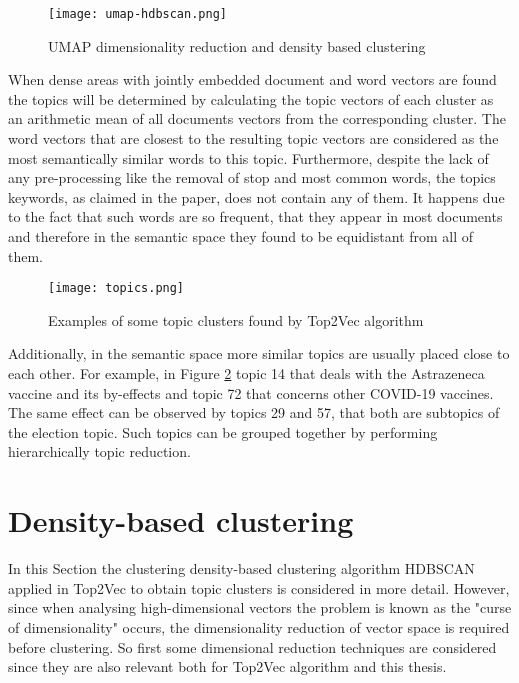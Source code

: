 \documentclass[fontsize=12pt,a4paper,twoside,openany]{scrbook}
\begin{document}
\begin{figure}[h]
\centering
\texttt{[image: umap-hdbscan.png]}
\caption{UMAP dimensionality reduction and density based clustering \parencite[see also][]{Angelov20}}
\label{fig:umap-hdbscan}
\end{figure}

When dense areas with jointly embedded document and word vectors are found the topics will be determined by calculating the topic vectors of each cluster as an arithmetic mean of all documents vectors from the corresponding cluster. The word vectors that are closest to the resulting topic vectors are considered as the most semantically similar words to this topic. Furthermore, despite the lack of any pre-processing like the removal of stop and most common words, the topics keywords, as claimed in the paper, does not contain any of them. It happens due to the fact that such words are so frequent, that they appear in most documents and therefore in the semantic space they found to be equidistant from all of them.

\begin{figure}[h]
\centering
\texttt{[image: topics.png]}
\caption{Examples of some topic clusters found by Top2Vec algorithm}
\label{fig:topics}
\end{figure}

Additionally, in the semantic space more similar topics are usually placed close to each other. For example, in Figure \ref{fig:topics} topic 14 that deals with the Astrazeneca vaccine and its by-effects and topic 72 that concerns other COVID-19 vaccines. The same effect can be observed by topics 29 and 57, that both are subtopics of the election topic. Such topics can be grouped together by performing hierarchically topic reduction.


\section{Density-based clustering}
\label{sec:C}

In this Section the clustering  density-based clustering algorithm HDBSCAN applied in Top2Vec to obtain topic clusters is considered in more detail. However, since when analysing high-dimensional vectors the problem is known as the "curse of dimensionality" \parencite{Theodoridis08} occurs, the dimensionality reduction of vector space is required before clustering. So first some dimensional reduction techniques are considered since they are also relevant both for Top2Vec algorithm and this thesis.
\end{document}
